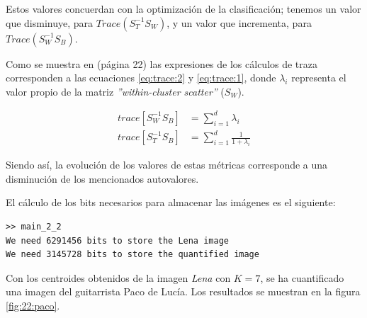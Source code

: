 \documentclass[11pt]{article} %
\begin{document}
Estos valores concuerdan con la optimización de la clasificación; tenemos un
valor que disminuye, para $Trace \left( S_T^{-1} S_W \right)$, y un valor que
incrementa, para $Trace \left( S_W^{-1} S_B \right)$.

Como se muestra en \cite{zanibbi_clustering_2010} (página 22) las expresiones de
los cálculos de traza corresponden a las ecuaciones \eqref{eq:trace:2} y
\eqref{eq:trace:1}, donde $\lambda_i$ representa el valor propio de la matriz
\emph{''within-cluster scatter''} ($S_W$).

\begin{align}
    \label{eq:trace:2}
    trace \left[ S_W^{-1} S_B \right] &= \sum_{i=1}^{d} \lambda_i \\
    \label{eq:trace:1}
    trace \left[ S_T^{-1} S_B \right] &= \sum_{i=1}^{d} \frac{1}{1 + \lambda_i}
\end{align}

Siendo así, la evolución de los valores de estas métricas corresponde a una
disminución de los mencionados autovalores.

\bigskip

El cálculo de los bits necesarios para almacenar las imágenes es el siguiente:

\begin{verbatim}
>> main_2_2
We need 6291456 bits to store the Lena image
We need 3145728 bits to store the quantified image
\end{verbatim}


Con los centroides obtenidos de la imagen \emph{Lena} con $K=7$, se ha
cuantificado una imagen del guitarrista Paco de Lucía. Los resultados se
muestran en la figura \ref{fig:22:paco}.
\end{document}
